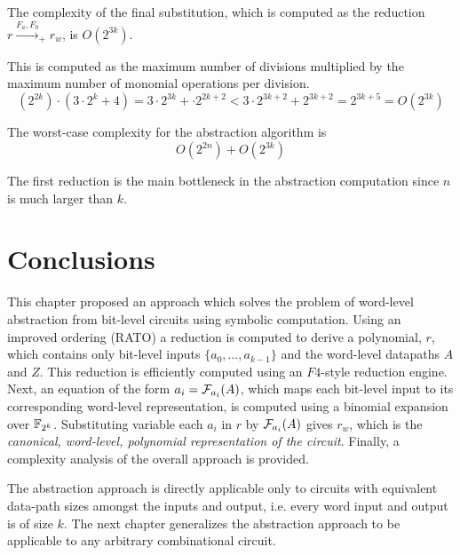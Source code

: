 \begin{Lemma}
The complexity of the final substitution, which is computed as the reduction
$r\xrightarrow{F_a,F_0}_+ r_w$, is $O(2^{3k})$.
\end{Lemma}
\begin{Proof}
This is computed as the maximum number of divisions multiplied by the maximum 
number of monomial operations per division.
\begin{equation}
(2^{2k})\cdot(3\cdot 2^{k}+4)=3\cdot 2^{3k}+\cdot 2^{2k+2} %
<3\cdot 2^{3k+2}+2^{3k+2}=2^{3k+5}=O(2^{3k})
\end{equation}
\end{Proof}

\begin{Theorem}
The worst-case complexity for the abstraction algorithm is
\begin{equation}
O(2^{2n})+O(2^{3k})
\end{equation}
\end{Theorem}

The first reduction is the main bottleneck in the abstraction computation 
since $n$ is much larger than $k$.

\section{Conclusions}
This chapter proposed an approach which solves the problem of word-level abstraction
from bit-level circuits using symbolic computation. 
Using an improved ordering (RATO) a reduction is computed 
to derive a polynomial, $r$, which contains only bit-level inputs $\{a_0,\dots,a_{k-1}\}$ 
and the word-level datapaths $A$ and $Z$. This reduction is efficiently computed 
using an $F4$-style reduction engine. Next, an equation of the form $a_i={\mathcal{F}}_{a_i}(A)$, which
maps each bit-level input to its corresponding word-level representation, is computed
using a binomial expansion over ${\mathbb{F}}_{2^k}$. Substituting variable each $a_i$ in $r$ by ${\mathcal{F}}_{a_i}(A)$
gives $r_w$, which is the {\it canonical, word-level, polynomial representation of the circuit}.
Finally, a complexity analysis of the overall approach is provided.

The abstraction approach is directly applicable only to circuits with equivalent
data-path sizes amongst the inputs and output, i.e. every word input and output 
is of size $k$. The next chapter generalizes the abstraction approach to be applicable
to any arbitrary combinational circuit.
